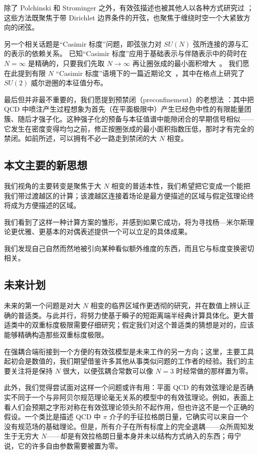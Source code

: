 除了 Polchinski
和 Strominger 之外，有效弦描述也被其他人以各种方式研究过 \cite{other}；这些方法既聚焦于带 Dirichlet 边界条件的开弦，也聚焦于缠绕时空一个大紧致方向的闭弦。

另一个相关话题是``Casimir 标度''问题，即弦张力对 $SU(N)$ 弦所连接的源与汇的表示的依赖关系。
已知``Casimir 标度''应用于基础表示与伴随表示中的荷时在 $N=\infty$
是精确的，只要我们先取 $N\to\infty$ 再让圈张成的最小面积增大~\cite{adlerneu}。
我们愿在此提到有限 $N$ ``Casimir 标度''语境下的一篇近期论文~\cite{negele}，其中在格点上研究了 $SU(2)$ 威尔逊圈的本征值分布。

最后但并非最不重要的，我们愿提到预禁闭（preconfinement）的老想法 \cite{amativ16}：其中把 QCD 中喷注产生过程想象为首先（在平面极限中）产生已经色中性的有限能量团簇、随后才强子化。这种强子化的预备与本征值谱中能隙闭合的早期信号相似——它发生在密度变得均匀之前，修正按圈张成的最小面积指数压低，那时才有完全的禁闭。如前所述，可以拥有不必一路走到禁闭的大 $N$ 相变。

\subsection{本文主要的新思想}

我们视角的主要转变是聚焦于大 $N$ 相变的普适本性，我们希望把它变成一个能把我们带过渡越区的计算；该渡越区连接着场论是最方便描述的区域与假定弦理论终将成为方便描述的区域。

我们看到了这样一种计算方案的雏形，并感到如果它成功，将为寻找杨—米尔斯理论更优雅、更基本的对偶表述提供一个可以立足的具体成果。

我们发现自己自然而然地被引向某种看似额外维度的东西，而且它与标度变换密切相关。


\subsection{未来计划}

未来的第一个问题是对大 $N$ 相变的临界区域作更透彻的研究，并在数值上辨认正确的普适类。与此并行，将努力使基于瞬子的短距离端半经典计算具体化。更大普适类中的双重标度极限需要仔细研究；假定我们对这个普适类的猜想是对的，应该能够精确构造那些双重标度极限。

在强耦合端衔接到一个方便的有效弦模型是未来工作的另一方向；这里，主要工具起初会是数值的，我们期望借鉴许多其他从事类似问题的工作者的经验。我们的主要关注将是保持 $N$ 很大，以便弦耦合常数可以像 $N=3$ 时经常做的那样置为零。

此外，我们觉得尝试面对这样一个问题或许有用：平面 QCD 的有效弦理论是否确实不同于一个与非阿贝尔规范理论毫无关系的模型中的有效弦理论。例如，表面上看人们会预期之字形对称在有效弦理论领头阶不起作用，但也许这不是一个正确的假设。一个类比是描述 QCD 中 $\pi$ 介子的手征拉格朗日量，它确实可以来自一个没有规范场的基础理论。但是，所有介子在所有标度上的完全退耦——众所周知发生于无穷大 $N$——却是有效拉格朗日量本身并未以结构方式纳入的东西；毋宁说，它的许多自由参数需要被置为零。
